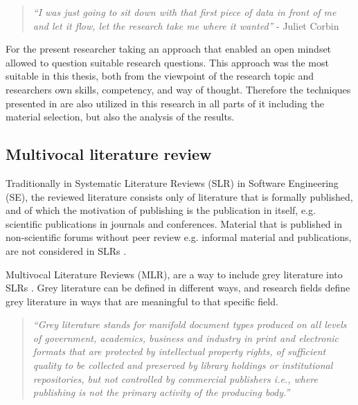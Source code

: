 \documentclass[english, 12pt, a4paper, sci, utf8, a-1b, online]{aaltothesis}
\begin{document}
\begin{quotation}
  \textit{``I was just going to sit down with that first piece of data in front of me and let it flow, let the research take me where it wanted''} - Juliet Corbin \parencite[p.~43]{developing-grounded-theory}
\end{quotation}

For the present researcher taking an approach that enabled an open mindset allowed to question suitable research questions. This approach was the most suitable in this thesis, both from the viewpoint of the research topic and researchers own skills, competency, and way of thought. Therefore the techniques presented in \textcite{developing-grounded-theory} are also utilized in this research in all parts of it including the material selection, but also the analysis of the results.

\subsection{Multivocal literature review} \label{section:multivocal-literature-review}

Traditionally in Systematic Literature Reviews (SLR) in Software Engineering (SE), the reviewed literature consists only of literature that is formally published, and of which the motivation of publishing is the publication in itself, e.g. scientific publications in journals and conferences. Material that is published in non-scientific forums without peer review e.g. informal material and publications, are not considered in SLRs \parencite{guidelines-for-MLR}.

Multivocal Literature Reviews (MLR), are a way to include grey literature into SLRs \parencite{the-need-for-MLR}. Grey literature can be defined in different ways, and research fields define grey literature in ways that are meaningful to that specific field.

\begin{quotation}
  \textit{``Grey literature stands for manifold document types produced on all levels of government, academics, business and industry in print and electronic formats that are protected by intellectual property rights, of sufficient quality to be collected and preserved by library holdings or institutional repositories, but not controlled by commercial publishers i.e., where publishing is not the primary activity of the producing body.''} \parencite{towards-a-prague-definition-of-grey-literature}
\end{quotation}
\end{document}
